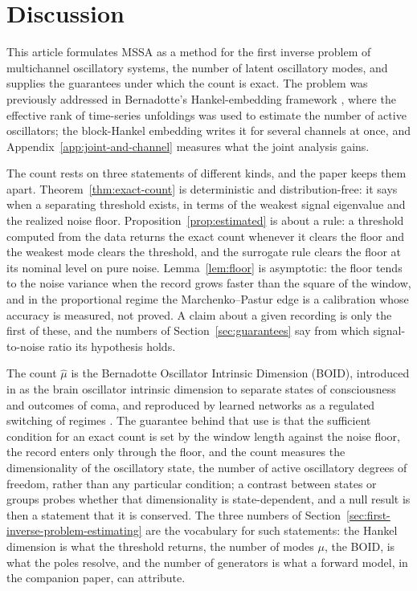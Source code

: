 \documentclass{article}
\begin{document}
\section{Discussion}\label{sec:discussion}

This article formulates MSSA as a method for the first inverse problem of multichannel oscillatory systems, the number of latent oscillatory modes, and supplies the guarantees under which the count is exact. The problem was previously addressed in Bernadotte's Hankel-embedding framework \cite{ref-BernadotteBuchstaber, ref-Bernadotte05}, where the effective rank of time-series unfoldings was used to estimate the number of active oscillators; the block-Hankel embedding writes it for several channels at once, and Appendix~\ref{app:joint-and-channel} measures what the joint analysis gains.

The count rests on three statements of different kinds, and the paper keeps them apart. Theorem~\ref{thm:exact-count} is deterministic and distribution-free: it says when a separating threshold exists, in terms of the weakest signal eigenvalue and the realized noise floor. Proposition~\ref{prop:estimated} is about a rule: a threshold computed from the data returns the exact count whenever it clears the floor and the weakest mode clears the threshold, and the surrogate rule clears the floor at its nominal level on pure noise. Lemma~\ref{lem:floor} is asymptotic: the floor tends to the noise variance when the record grows faster than the square of the window, and in the proportional regime the Marchenko--Pastur edge is a calibration whose accuracy is measured, not proved. A claim about a given recording is only the first of these, and the numbers of Section~\ref{sec:guarantees} say from which signal-to-noise ratio its hypothesis holds.

The count $\widehat{\mu}$ is the Bernadotte Oscillator Intrinsic Dimension (BOID), introduced in \cite{ref-Bernadotte07} as the brain oscillator intrinsic dimension to separate states of consciousness and outcomes of coma, and reproduced by learned networks as a regulated switching of regimes \cite{ref-ACTBOID}. The guarantee behind that use is that the sufficient condition for an exact count is set by the window length against the noise floor, the record enters only through the floor, and the count measures the dimensionality of the oscillatory state, the number of active oscillatory degrees of freedom, rather than any particular condition; a contrast between states or groups probes whether that dimensionality is state-dependent, and a null result is then a statement that it is conserved. The three numbers of Section~\ref{sec:first-inverse-problem-estimating} are the vocabulary for such statements: the Hankel dimension is what the threshold returns, the number of modes $\mu$, the BOID, is what the poles resolve, and the number of generators is what a forward model, in the companion paper, can attribute.
\end{document}
